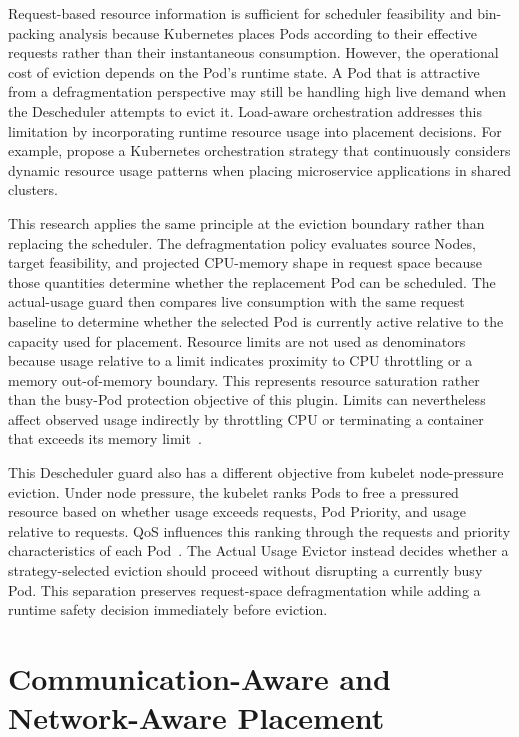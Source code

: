 Request-based resource information is sufficient for scheduler feasibility and bin-packing analysis because Kubernetes places Pods according to their effective requests rather than their instantaneous consumption. However, the operational cost of eviction depends on the Pod's runtime state. A Pod that is attractive from a defragmentation perspective may still be handling high live demand when the Descheduler attempts to evict it. Load-aware orchestration addresses this limitation by incorporating runtime resource usage into placement decisions. For example, \citet{marchese2024loadaware} propose a Kubernetes orchestration strategy that continuously considers dynamic resource usage patterns when placing microservice applications in shared clusters.

This research applies the same principle at the eviction boundary rather than replacing the scheduler. The defragmentation policy evaluates source Nodes, target feasibility, and projected CPU-memory shape in request space because those quantities determine whether the replacement Pod can be scheduled. The actual-usage guard then compares live consumption with the same request baseline to determine whether the selected Pod is currently active relative to the capacity used for placement. Resource limits are not used as denominators because usage relative to a limit indicates proximity to CPU throttling or a memory out-of-memory boundary. This represents resource saturation rather than the busy-Pod protection objective of this plugin. Limits can nevertheless affect observed usage indirectly by throttling CPU or terminating a container that exceeds its memory limit~\citep{k8s_resource_management}.

This Descheduler guard also has a different objective from kubelet node-pressure eviction. Under node pressure, the kubelet ranks Pods to free a pressured resource based on whether usage exceeds requests, Pod Priority, and usage relative to requests. QoS influences this ranking through the requests and priority characteristics of each Pod~\citep{k8s_node_pressure_eviction}. The Actual Usage Evictor instead decides whether a strategy-selected eviction should proceed without disrupting a currently busy Pod. This separation preserves request-space defragmentation while adding a runtime safety decision immediately before eviction.

\section{Communication-Aware and Network-Aware Placement}
\label{sec:networkAwareScheduling}


